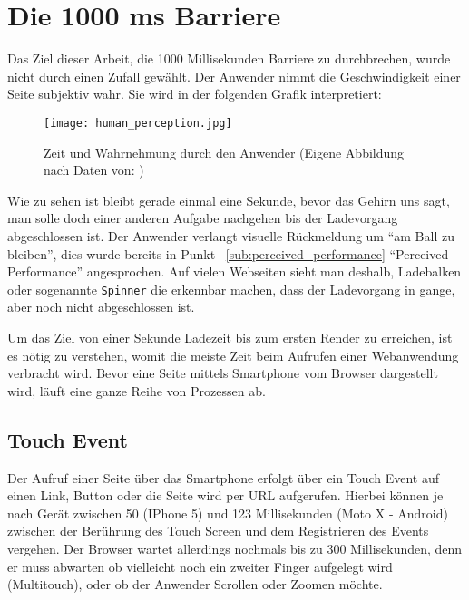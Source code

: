 	\pagebreak



\section{Die 1000 ms Barriere} %
\label{sec:die_1000_ms_barriere}
	Das Ziel dieser Arbeit, die 1000 Millisekunden Barriere zu durchbrechen, wurde nicht durch einen Zufall gewählt. Der Anwender nimmt die Geschwindigkeit einer Seite subjektiv wahr. Sie wird in der folgenden Grafik interpretiert:

	\begin{figure}[htbp]
		\begin{center}
			\texttt{[image: human\_perception.jpg]}
			\caption{Zeit und Wahrnehmung durch den Anwender (Eigene Abbildung nach Daten von: \autocite{grigorikHumanPerception})}
			\label{fig:human_perception}
		\end{center}
	\end{figure}

	Wie zu sehen ist bleibt gerade einmal eine Sekunde, bevor das Gehirn uns sagt, man solle doch einer anderen Aufgabe nachgehen bis der Ladevorgang abgeschlossen ist. Der Anwender verlangt visuelle Rückmeldung um "`am Ball zu bleiben"', dies wurde bereits in Punkt ~\ref{sub:perceived_performance} "`Perceived Performance"' angesprochen. Auf vielen Webseiten sieht man deshalb, Ladebalken oder sogenannte \texttt{Spinner} die erkennbar machen, dass der Ladevorgang in gange, aber noch nicht abgeschlossen ist.

	Um das Ziel von einer Sekunde Ladezeit bis zum ersten Render zu erreichen, ist es nötig zu verstehen, womit die meiste Zeit beim Aufrufen einer Webanwendung verbracht wird. Bevor eine Seite mittels Smartphone vom Browser dargestellt wird, läuft eine ganze Reihe von Prozessen ab.



	\subsection{Touch Event} %
	\label{sub:touch_event}
		Der Aufruf einer Seite über das Smartphone erfolgt über ein Touch Event auf einen Link, Button oder die Seite wird per URL aufgerufen. Hierbei können je nach Gerät zwischen 50 (IPhone 5) und 123 Millisekunden (Moto X - Android) zwischen der Berührung des Touch Screen und dem Registrieren des Events vergehen.\autocite{venturebeat} Der Browser wartet allerdings nochmals bis zu 300 Millisekunden, denn er muss abwarten ob vielleicht noch ein zweiter Finger aufgelegt wird (Multitouch), oder ob der Anwender Scrollen oder Zoomen möchte.\autocite{google11}

